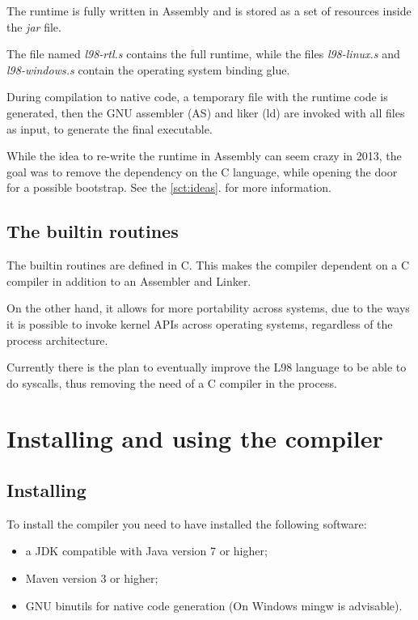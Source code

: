\documentclass[a4paper, 11pt]{report}
\begin{document}
The runtime is fully written in Assembly and is stored as a set of resources inside the \emph{jar}
file.

The file named \emph{l98-rtl.s} contains the full runtime, while the files \emph{l98-linux.s} and
\emph{l98-windows.s} contain the operating system binding glue.

During compilation to native code, a temporary file with the runtime code is generated, then the
GNU assembler (AS) and liker (ld) are invoked with all files as input, to generate the final executable.

While the idea to re-write the runtime in Assembly can seem crazy in 2013, the goal was to remove
the dependency on the C language, while opening the door for a possible bootstrap. See the \ref{sct:ideas}.
for more information.


\section{The builtin routines}

  The builtin routines are defined in C. This makes the compiler dependent on a C
compiler in addition to an Assembler and Linker.

  On the other hand, it allows for more portability across systems, due to the
ways it is possible to invoke kernel APIs across operating systems, regardless of
the process architecture.

  Currently there is the plan to eventually improve the L98 language to be able to
do syscalls, thus removing the need of a C compiler in the process.

\chapter{Installing and using the compiler}

\section{Installing}
  To install the compiler you need to have installed the following software:

\begin{itemize}  
\item a JDK compatible with Java version 7 or higher;
\item Maven version 3 or higher;
\item GNU binutils for native code generation (On Windows mingw is advisable).
\end{itemize}
\end{document}
